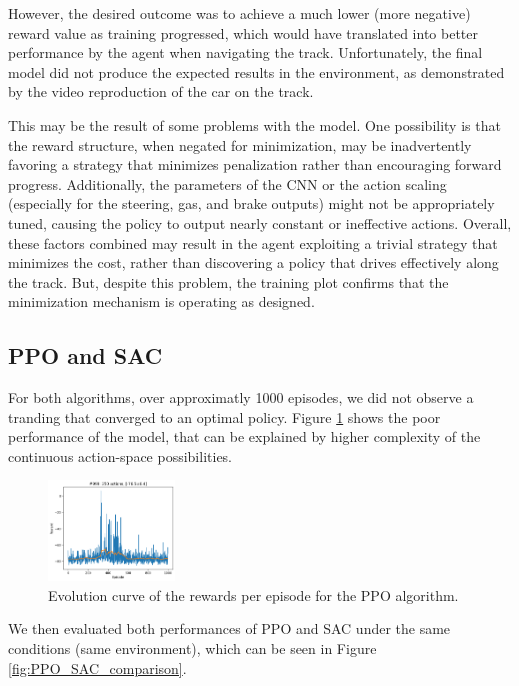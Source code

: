 \documentclass[../CSC_52081_EP.tex]{subfiles}
\begin{document}
However, the desired outcome was to achieve a much lower (more negative) reward value as training progressed, which would have translated into better performance by the agent when navigating the track. Unfortunately, the final model did not produce the expected results in the environment, as demonstrated by the video reproduction of the car on the track.

This may be the result of some problems with the model. One possibility is that the reward structure, when negated for minimization, may be inadvertently favoring a strategy that minimizes penalization rather than encouraging forward progress. Additionally, the parameters of the CNN or the action scaling (especially for the steering, gas, and brake outputs) might not be appropriately tuned, causing the policy to output nearly constant or ineffective actions. Overall, these factors combined may result in the agent exploiting a trivial strategy that minimizes the cost, rather than discovering a policy that drives effectively along the track. But, despite this problem, the training plot confirms that the minimization mechanism is operating as designed.

\subsection{PPO and SAC}

For both algorithms, over approximatly 1000 episodes, we did not observe a tranding that converged to an optimal policy. Figure \ref{fig:PPO_train} shows the poor performance of the model, that can be explained by higher complexity of the continuous action-space possibilities.

\begin{figure}[H]
    \centering
    \includegraphics[width=0.3\textwidth]{figures/reward_per_episode_PPO.png}
    \caption{Evolution curve of the rewards per episode for the PPO algorithm.}
    \label{fig:PPO_train}
\end{figure}

We then evaluated both performances of PPO and SAC under the same conditions (same environment), which can be seen in Figure \ref{fig:PPO_SAC_comparison}.
\end{document}
